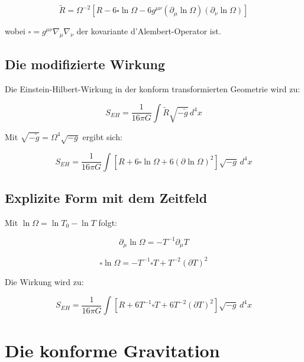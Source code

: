 \documentclass[12pt,a4paper]{report}
\begin{document}
	\begin{equation}
		\tilde{R} = \Omega^{-2}[R - 6\square\ln \Omega - 6g^{\mu\nu}(\partial_\mu \ln \Omega)(\partial_\nu \ln \Omega)]
	\end{equation}
	
	wobei $\square = g^{\mu\nu}\nabla_\mu\nabla_\nu$ der kovariante d'Alembert-Operator ist.
	
	\subsection{Die modifizierte Wirkung}
	
	Die Einstein-Hilbert-Wirkung in der konform transformierten Geometrie wird zu:
	
	\begin{equation}
		S_{EH} = \frac{1}{16\pi G} \int \tilde{R} \sqrt{-\tilde{g}} \, d^4x
	\end{equation}
	
	Mit $\sqrt{-\tilde{g}} = \Omega^4 \sqrt{-g}$ ergibt sich:
	
	\begin{equation}
		S_{EH} = \frac{1}{16\pi G} \int [R + 6\square\ln \Omega + 6(\partial\ln \Omega)^2] \sqrt{-g} \, d^4x
	\end{equation}
	
	\subsection{Explizite Form mit dem Zeitfeld}
	
	Mit $\ln \Omega = \ln T_0 - \ln T$ folgt:
	
	\begin{equation}
		\partial_\mu \ln \Omega = -T^{-1}\partial_\mu T
	\end{equation}
	
	\begin{equation}
		\square\ln \Omega = -T^{-1}\square T + T^{-2}(\partial T)^2
	\end{equation}
	
	Die Wirkung wird zu:
	
	\begin{equation}
		S_{EH} = \frac{1}{16\pi G} \int [R + 6T^{-1}\square T + 6T^{-2}(\partial T)^2] \sqrt{-g} \, d^4x
	\end{equation}
	
	\section{Die konforme Gravitation}
	
\end{document}

